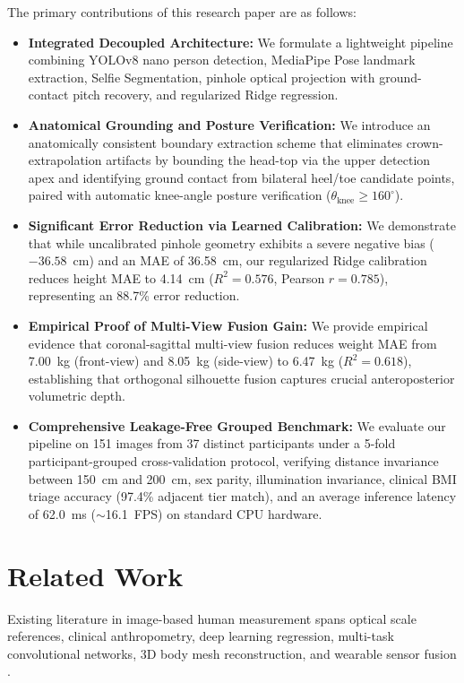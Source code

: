 \documentclass[conference]{IEEEtran}
\begin{document}
The primary contributions of this research paper are as follows:
\begin{itemize}
    \item \textbf{Integrated Decoupled Architecture:} We formulate a lightweight pipeline combining YOLOv8 nano person detection, MediaPipe Pose landmark extraction, Selfie Segmentation, pinhole optical projection with ground-contact pitch recovery, and regularized Ridge regression.
    \item \textbf{Anatomical Grounding and Posture Verification:} We introduce an anatomically consistent boundary extraction scheme that eliminates crown-extrapolation artifacts by bounding the head-top via the upper detection apex and identifying ground contact from bilateral heel/toe candidate points, paired with automatic knee-angle posture verification ($\theta_{\text{knee}} \ge 160^\circ$).
    \item \textbf{Significant Error Reduction via Learned Calibration:} We demonstrate that while uncalibrated pinhole geometry exhibits a severe negative bias ($-36.58$~cm) and an MAE of 36.58~cm, our regularized Ridge calibration reduces height MAE to 4.14~cm ($R^2=0.576$, Pearson $r=0.785$), representing an 88.7\% error reduction.
    \item \textbf{Empirical Proof of Multi-View Fusion Gain:} We provide empirical evidence that coronal-sagittal multi-view fusion reduces weight MAE from 7.00~kg (front-view) and 8.05~kg (side-view) to 6.47~kg ($R^2=0.618$), establishing that orthogonal silhouette fusion captures crucial anteroposterior volumetric depth.
    \item \textbf{Comprehensive Leakage-Free Grouped Benchmark:} We evaluate our pipeline on 151 images from 37 distinct participants under a 5-fold participant-grouped cross-validation protocol, verifying distance invariance between 150~cm and 200~cm, sex parity, illumination invariance, clinical BMI triage accuracy (97.4\% adjacent tier match), and an average inference latency of 62.0~ms ($\sim$16.1~FPS) on standard CPU hardware.
\end{itemize}

\section{Related Work}
Existing literature in image-based human measurement spans optical scale references, clinical anthropometry, deep learning regression, multi-task convolutional networks, 3D body mesh reconstruction, and wearable sensor fusion \cite{jan2025}.
\end{document}
